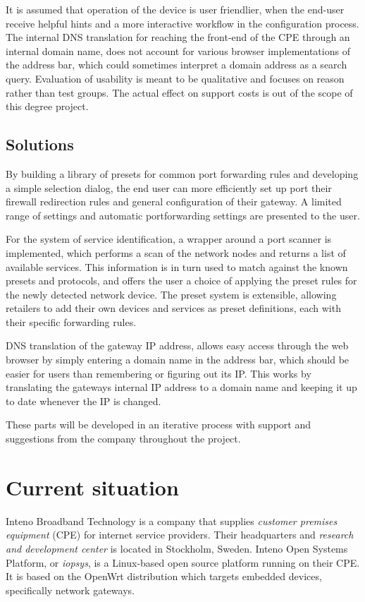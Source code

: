 \documentclass[a4paper,11pt,makeidx]{kth-bcs}
\begin{document}
It is assumed that operation of the device is user friendlier, when the end-user receive helpful hints and a more interactive workflow in the configuration process.
The internal DNS translation for reaching the front-end of the CPE through an internal domain name, does not account for various browser implementations of the address bar, which could sometimes interpret a domain address as a search query.
Evaluation of usability is meant to be qualitative and focuses on reason rather than test groups.
The actual effect on support costs is out of the scope of this degree project.

\section{Solutions}
By building a library of presets for common port forwarding rules and developing a simple selection dialog, the end user can more efficiently set up port their firewall redirection rules and general configuration of their gateway.
A limited range of settings and automatic portforwarding settings are presented to the user.

For the system of service identification, a wrapper around a port scanner is implemented, which performs a scan of the network nodes and returns a list of available services.
This information is in turn used to match against the known presets and protocols, and offers the user a choice of applying the preset rules for the newly detected network device.
The preset system is extensible, allowing retailers to add their own devices and services as preset definitions, each with their specific forwarding rules.

DNS translation of the gateway IP address, allows easy access through the web browser by simply entering a domain name in the address bar, which should be easier for users than remembering or figuring out its IP.
This works by translating the gateways internal IP address to a domain name and keeping it up to date whenever the IP is changed.

These parts will be developed in an iterative process with support and suggestions from the company throughout the project.

\chapter{Current situation}
Inteno Broadband Technology is a company that supplies \emph{customer premises equipment} (CPE) for internet service providers.  
Their headquarters and \emph{research and development center} is located in Stockholm, Sweden.
Inteno Open Systems Platform, or \emph{iopsys}, is a Linux-based open source platform running on their CPE.
It is based on the OpenWrt distribution which targets embedded devices, specifically network gateways.\cite{Inteno}
\end{document}
